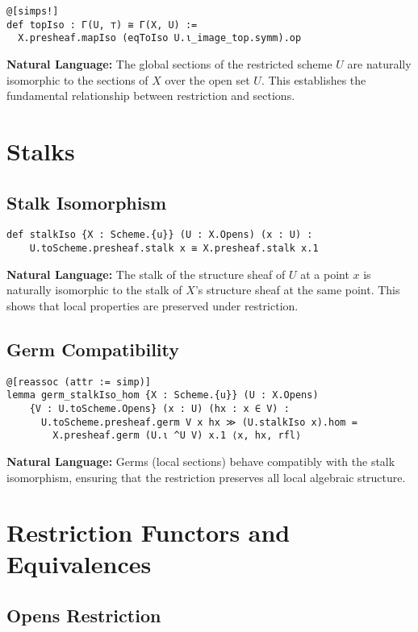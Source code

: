 \documentclass{article}
\theoremstyle{definition}
\begin{document}
\begin{lstlisting}
@[simps!]
def topIso : Γ(U, ⊤) ≅ Γ(X, U) :=
  X.presheaf.mapIso (eqToIso U.ι_image_top.symm).op
\end{lstlisting}

\textbf{Natural Language:} The global sections of the restricted scheme $U$ are naturally isomorphic to the sections of $X$ over the open set $U$. This establishes the fundamental relationship between restriction and sections.

\section{Stalks}

\subsection{Stalk Isomorphism}

\begin{lstlisting}
def stalkIso {X : Scheme.{u}} (U : X.Opens) (x : U) :
    U.toScheme.presheaf.stalk x ≅ X.presheaf.stalk x.1
\end{lstlisting}

\textbf{Natural Language:} The stalk of the structure sheaf of $U$ at a point $x$ is naturally isomorphic to the stalk of $X$'s structure sheaf at the same point. This shows that local properties are preserved under restriction.

\subsection{Germ Compatibility}

\begin{lstlisting}
@[reassoc (attr := simp)]
lemma germ_stalkIso_hom {X : Scheme.{u}} (U : X.Opens)
    {V : U.toScheme.Opens} (x : U) (hx : x ∈ V) :
      U.toScheme.presheaf.germ V x hx ≫ (U.stalkIso x).hom =
        X.presheaf.germ (U.ι ^U V) x.1 ⟨x, hx, rfl⟩
\end{lstlisting}

\textbf{Natural Language:} Germs (local sections) behave compatibly with the stalk isomorphism, ensuring that the restriction preserves all local algebraic structure.

\section{Restriction Functors and Equivalences}

\subsection{Opens Restriction}
\end{document}
